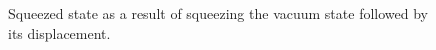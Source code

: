 \begin{figure}
\centering



\caption{Squeezed state as a result of squeezing the vacuum state followed by its displacement.}
\label{figPart3Squeezed_8}
\end{figure}